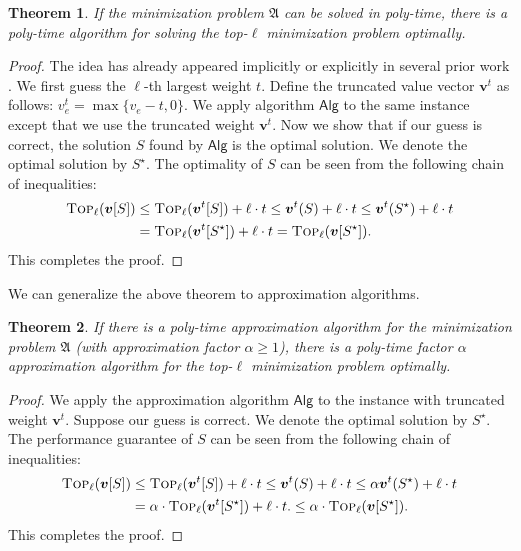\documentclass[11pt,a4paper]{article} \usepackage{enumitem}
\newcommand{\boldv}{\boldsymbol{v}}
\newcommand{\myproblem}{\mathfrak{A}}
\newcommand{\Algo}{\mathsf{Alg}}
\newcommand{\topp}[1]{\textsc{Top}_{#1}}
\newtheorem{theorem}{Theorem}[section]
\theoremstyle{definition}
\begin{document}
\begin{theorem} \label{thm:topl-1}
If the minimization problem $\myproblem$ can be solved in poly-time, 
there is a poly-time algorithm for solving the top-$\ell$ {\em minimization} problem optimally.
\end{theorem}

\begin{proof}
The idea has already appeared implicitly or explicitly in several prior work \cite{byrka2018constant,maalouly2022exact}. 
We first guess the $\ell$-th largest weight $t$.
Define the truncated value vector $\boldv^t$ as follows:
$v^t_e = \max \{v_e-t, 0\}$.
We apply algorithm $\Algo$ to the same instance except that we use the truncated weight $\boldv^t$.
Now we show that if our guess is correct, the solution $S$ found by $\Algo$
is the optimal solution.
We denote the optimal solution by $S^\star$.
The optimality of $S$ can be seen from the following chain of inequalities:
\begin{align*}
\topp{\ell}(\boldv[S]) & \leq \topp{\ell}(\boldv^t[S]) +\ell \cdot t
\leq \boldv^t(S) +\ell \cdot t
\leq \boldv^t(S^\star) +\ell \cdot t \\
& =\topp{\ell}(\boldv^t[S^\star])+\ell \cdot t
  =\topp{\ell}(\boldv[S^\star]).
\end{align*}
This completes the proof.
\end{proof}

We can generalize the above theorem to approximation algorithms.

\begin{theorem}
If there is a poly-time approximation algorithm for the minimization problem $\myproblem$ (with approximation factor $\alpha\geq 1$), 
there is a poly-time factor $\alpha$ approximation algorithm for the top-$\ell$ {\em minimization} problem optimally.
\end{theorem}
\begin{proof}
We apply the approximation algorithm $\Algo$ to the instance with 
truncated weight $\boldv^t$.
Suppose our guess is correct.
We denote the optimal solution by $S^\star$.
The performance guarantee of $S$ can be seen from the following chain of inequalities:
\begin{align*}
\topp{\ell}(\boldv[S]) & \leq \topp{\ell}(\boldv^t[S]) +\ell \cdot t
\leq \boldv^t(S) +\ell \cdot t
\leq \alpha\boldv^t(S^\star) +\ell \cdot t \\
& =\alpha\cdot \topp{\ell}(\boldv^t[S^\star])+\ell \cdot t.
  \leq \alpha\cdot\topp{\ell}(\boldv[S^\star]).
\end{align*}
This completes the proof.
\end{proof}
\end{document}
